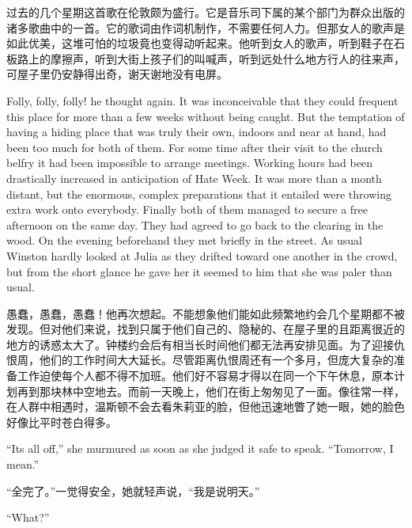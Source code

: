 \begin{paracol}{2}
\switchcolumn

过去的几个星期这首歌在伦敦颇为盛行。它是音乐司下属的某个部门为群众出版的诸多歌曲中的一首。它的歌词由作词机制作，不需要任何人力。但那女人的歌声是如此优美，这堆可怕的垃圾竟也变得动听起来。他听到女人的歌声，听到鞋子在石板路上的摩擦声，听到大街上孩子们的叫喊声，听到远处什么地方行人的往来声，可屋子里仍安静得出奇，谢天谢地没有电屏。

\switchcolumn*

Folly, folly, folly! he thought again. It was inconceivable that they
could frequent this place for more than a few weeks without being
caught. But the temptation of having a hiding place that was truly their
own, indoors and near at hand, had been too much for both of them. For
some time after their visit to the church belfry it had been impossible
to arrange meetings. Working hours had been drastically increased in
anticipation of Hate Week. It was more than a month distant, but the
enormous, complex preparations that it entailed were throwing extra work
onto everybody. Finally both of them managed to secure a free afternoon
on the same day. They had agreed to go back to the clearing in the wood.
On the evening beforehand they met briefly in the street. As usual
Winston hardly looked at Julia as they drifted toward one another in the
crowd, but from the short glance he gave her it seemed to him that she
was paler than usual.

\switchcolumn

愚蠢，愚蠢，愚蠢！他再次想起。不能想象他们能如此频繁地约会几个星期都不被发现。但对他们来说，找到只属于他们自己的、隐秘的、在屋子里的且距离很近的地方的诱惑太大了。钟楼约会后有相当长时间他们都无法再安排见面。为了迎接仇恨周，他们的工作时间大大延长。尽管距离仇恨周还有一个多月，但庞大复杂的准备工作迫使每个人都不得不加班。他们好不容易才得以在同一个下午休息，原本计划再到那块林中空地去。而前一天晚上，他们在街上匆匆见了一面。像往常一样，在人群中相遇时，温斯顿不会去看朱莉亚的脸，但他迅速地瞥了她一眼，她的脸色好像比平时苍白得多。

\switchcolumn*

``It\textquotesingle s all off,'' she murmured as soon as she judged it
safe to speak. ``Tomorrow, I mean.''

\switchcolumn

``全完了。''一觉得安全，她就轻声说，``我是说明天。''

\switchcolumn*

``What?''

\switchcolumn


\end{paracol}
